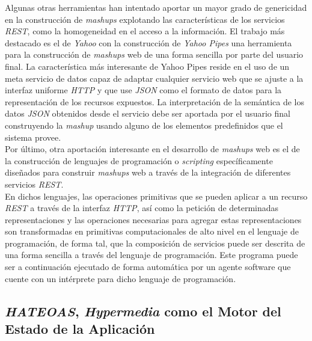 Algunas otras herramientas han intentado aportar un mayor grado de genericidad en la construcci\'on de \textit{mashups} explotando las caracter\'isticas de los servicios \textit{REST}, como la homogeneidad en el acceso a la informaci\'on. El trabajo m\'as destacado es el de \textit{Yahoo} con la construcci\'on de \textit{Yahoo Pipes} \cite{yahoo_pipes} una herramienta para la construcci\'on de \textit{mashups} web de una forma sencilla por parte del usuario final. La caracter\'istica m\'as interesante de Yahoo Pipes reside en el uso de un meta servicio de datos capaz de adaptar cualquier servicio web que se ajuste a la interfaz uniforme \textit{HTTP} y que use \textit{JSON} como el formato de datos para la representaci\'on de los recursos expuestos. La interpretaci\'on de la sem\'antica de los datos \textit{JSON} obtenidos desde el servicio debe ser aportada por el usuario final construyendo la \textit{mashup} usando alguno de los elementos predefinidos que el sistema provee.\\
Por \'ultimo, otra aportaci\'on interesante en el desarrollo de \textit{mashups} web es el de la construcci\'on de lenguajes de programaci\'on o \textit{scripting} \cite{sabbouh2007web} espec\'ificamente dise\~nados para construir \textit{mashups} web a trav\'es de la integraci\'on de diferentes servicios \textit{REST}.\\
En dichos lenguajes, las operaciones primitivas que se pueden aplicar a un recurso \textit{REST} a trav\'es de la interfaz \textit{HTTP}, as\'i como la petici\'on de determinadas representaciones y las operaciones necesarias para agregar estas representaciones son transformadas en primitivas computacionales de alto nivel en el lenguaje de programaci\'on, de forma tal, que la composici\'on de servicios puede ser descrita de una forma sencilla a trav\'es del lenguaje de programaci\'on. Este programa puede ser a continuaci\'on ejecutado de forma autom\'atica por un agente software que cuente con un int\'erprete para dicho lenguaje de programaci\'on.\\

\subsection{\textit{HATEOAS}, \textit{Hypermedia} como el Motor del Estado de la Aplicaci\'on}

